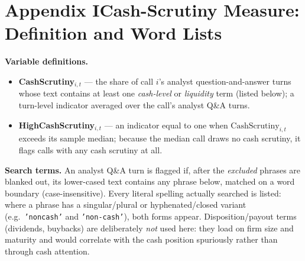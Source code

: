 \section*{Appendix I\quad Cash-Scrutiny Measure: Definition and Word Lists}
\vspace{4pt}\noindent\textbf{Variable definitions.}
\begin{itemize}\setlength\itemsep{2pt}
\item \textbf{CashScrutiny}$_{i,t}$ --- the share of call $i$'s analyst question-and-answer turns whose text contains at least one \emph{cash-level} or \emph{liquidity} term (listed below); a turn-level indicator averaged over the call's analyst Q\&A turns.
\item \textbf{HighCashScrutiny}$_{i,t}$ --- an indicator equal to one when $\mathrm{CashScrutiny}_{i,t}$ exceeds its sample median; because the median call draws no cash scrutiny, it flags calls with any cash scrutiny at all.
\end{itemize}
\vspace{4pt}\noindent\textbf{Search terms.} An analyst Q\&A turn is flagged if, after the \emph{excluded} phrases are blanked out, its lower-cased text contains any phrase below, matched on a word boundary (case-insensitive). Every literal spelling actually searched is listed: where a phrase has a singular/plural or hyphenated/closed variant (e.g.\ \texttt{'noncash'} and \texttt{'non-cash'}), both forms appear. Disposition/payout terms (dividends, buybacks) are deliberately \emph{not} used here: they load on firm size and maturity and would correlate with the cash position spuriously rather than through cash attention.
